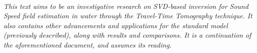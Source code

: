 \begin{minipage}{0.9\linewidth}
\end{minipage} \\[0.5cm]
\begin{center}
\begin{minipage}{0.7\linewidth}
		\itshape This text aims to be an investigative research on SVD-based inversion for Sound Speed field estimation in water through the Travel-Time Tomography technique. It also contains other advancements and applications for the standard model (previously described), along with results and comparisons. It is a continuation of the aforementioned  document, and assumes its reading.
	\end{minipage}
\end{center}